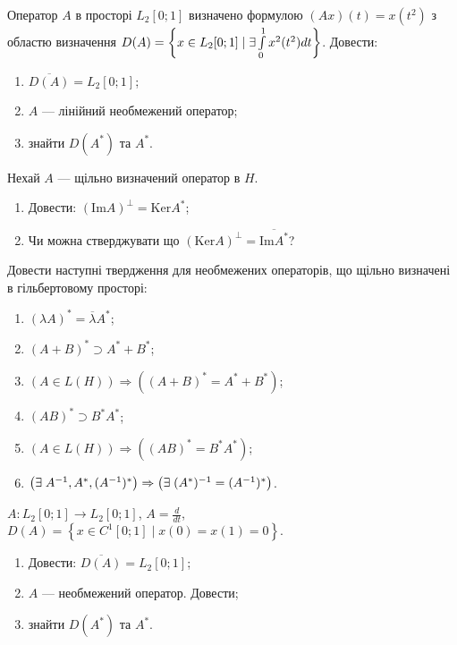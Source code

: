 \begin{exercise}
    Оператор $A$ в просторі $L_2[0;1]$ визначено формулою $(Ax)(t) = x(t^2)$ з областю визначення
    $D(A) = \left\{ x \in L_2[0;1] \mid \exists \int\limits_{0}^{1} x^2(t^2) dt \right\}$. Довести:
    \begin{enumerate}
        \item $\overline{D(A)} = L_2[0;1]$;
        \item $A$ --- лінійний необмежений оператор;
        \item знайти $D(A^*)$ та $A^*$.
    \end{enumerate}
\end{exercise}

\begin{exercise}
    Нехай $A$ --- щільно визначений оператор в $H$.
    \begin{enumerate}
        \item Довести: $(\mathrm{Im}A)^\perp = \mathrm{Ker}A^*$;
        \item Чи можна стверджувати що $(\mathrm{Ker}A)^\perp = \overline{\mathrm{Im}A^*}$?
    \end{enumerate}
\end{exercise}

\begin{exercise}
    Довести наступні твердження для необмежених операторів, що щільно визначені в гільбертовому
    просторі:
    \begin{enumerate}
        \item $(\lambda A)^* = \overline{\lambda} A^*$;
        \item $(A + B)^* \supset A^* + B^*$;
        \item $(A \in L(H)) \Rightarrow \left( (A+B)^* = A^* + B^* \right)$;
        \item $(AB)^* \supset B^* A^*$;
        \item $(A \in L(H)) \Rightarrow \left( (AB)^* = B^* A^* \right)$;
        \item $\left( \exists \; A^{-1}, A^*, (A^{-1})^* \right) \Rightarrow
               \left( \exists \; (A^*)^{-1} = (A^{-1})^* \right)$.
    \end{enumerate}
\end{exercise}

\begin{exercise}
    $A : L_2[0;1] \to L_2[0;1]$, $A = \frac{d}{dt}$,
    $D(A) = \left\{
        x \in C^1[0;1] \mid x(0) = x(1) = 0
    \right\}.$
    \begin{enumerate}
        \item Довести: $\overline{D(A)} = L_2[0;1]$;
        \item $A$ --- необмежений оператор. Довести;
        \item знайти $D(A^*)$ та $A^*$. 
    \end{enumerate}
\end{exercise}

